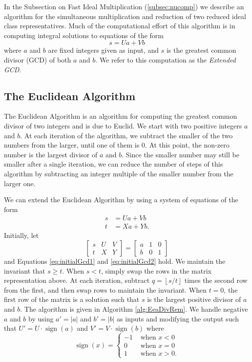 \documentclass{ucalgthes1}
\theoremstyle{definition}
\DeclareMathOperator{\sign}{sign}
\newcommand{\matrixThreeTwo}[6]{\left[ \begin{array}{rrr} #1 & #2 & #3 \\ #4 & #5 & #6 \end{array} \right]}
\newcommand{\floor}[1]{\left\lfloor #1 \right\rfloor}
\begin{document}
In the Subsection on Fast Ideal Multiplication (\ref{subsec:nucomp}) we describe an algorithm for the simultaneous multiplication and reduction of two reduced ideal class representatives.  Much of the computational effort of this algorithm is in computing integral solutions to equations of the form
\[
	s = Ua + Vb
\]
where $a$ and $b$ are fixed integers given as input, and $s$ is the greatest common divisor (GCD) of both $a$ and $b$.  We refer to this computation as the \emph{Extended GCD}.

\subsection{The Euclidean Algorithm}

The Euclidean Algorithm is an algorithm for computing the greatest common divisor of two integers and is due to Euclid.  We start with two positive integers $a$ and $b$.  At each iteration of the algorithm, we subtract the smaller of the two numbers from the larger, until one of them is 0. At this point, the non-zero number is the largest divisor of $a$ and $b$.  Since the smaller number may still be smaller after a single iteration, we can reduce the number of steps of this algorithm by subtracting an integer multiple of the smaller number from the larger one.

We can extend the Euclidean Algorithm by using a system of equations of the form
\begin{align}
s &= Ua + Vb \label{eq:initialGcd1} \\
t &= Xa + Yb. \label{eq:initialGcd2}
\end{align}
Initially, let
\[
\matrixThreeTwo{s}{U}{V}{t}{X}{Y} = \matrixThreeTwo{a}{1}{0}{b}{0}{1}
\]
and Equations \ref{eq:initialGcd1} and \ref{eq:initialGcd2} hold.  We maintain the invariant that $s \ge t$.  When $s < t$, simply swap the rows in the matrix representation above.  At each iteration, subtract $q = \floor{s/t}$ times the second row from the first, and then swap rows to maintain the invariant.  When $t=0$, the first row of the matrix is a solution such that $s$ is the largest positive divisor of $a$ and $b$.  The algorithm is given in Algorithm \ref{alg:EeaDivRem}.  We handle negative $a$ and $b$ by using $a' = |a|$ and $b' = |b|$ as inputs and modifying the output such that $U' = U \cdot \sign(a)$ and $V' = V \cdot \sign(b)$ where
\[
	\sign(x) = \begin{cases}
		-1 & \textrm{ when } x < 0 \\
		0 & \textrm{ when } x = 0 \\
		1 & \textrm{ when } x > 0.
	\end{cases}
\]
\end{document}

